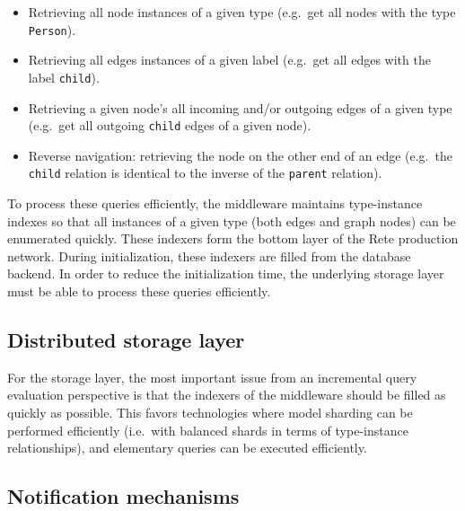 \begin{itemize}
  \item Retrieving all node instances of a given type (e.g.\ get all nodes with the type \texttt{Person}).
  \item Retrieving all edges instances of a given label (e.g.\ get all edges with the label \texttt{child}).
  \item Retrieving a given node's all incoming and/or outgoing edges of a given type (e.g.\ get all outgoing \texttt{child} edges of a given node). 
  \item Reverse navigation: retrieving the node on the other end of an edge (e.g.\ the \texttt{child} relation is identical to the inverse of the \texttt{parent} relation). 
\end{itemize}

To process these queries efficiently, the \iqd{} middleware maintains type-instance indexes so that all instances of a given type (both edges and graph nodes) can be enumerated quickly. These indexers form the bottom layer of the Rete production network. During initialization, these indexers are filled from the database backend. In order to reduce the initialization time, the underlying storage layer must be able to process these queries efficiently. 


\subsection{Distributed storage layer}
\label{storage}

For the storage layer, the most important issue from an incremental query evaluation perspective is that the indexers of the middleware should be filled as quickly as possible. This favors technologies where model sharding can be performed efficiently (i.e.\ with balanced shards in terms of type-instance relationships), and elementary queries 
can be executed efficiently.


\subsection{Notification mechanisms}
\label{notifications}


